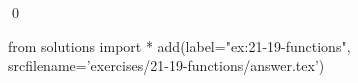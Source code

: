 
\begin{ex}
  \label{ex:21-19-functions}
  
  \qed
\end{ex}
\begin{python0}
from solutions import *
add(label="ex:21-19-functions",
    srcfilename='exercises/21-19-functions/answer.tex')
\end{python0}
